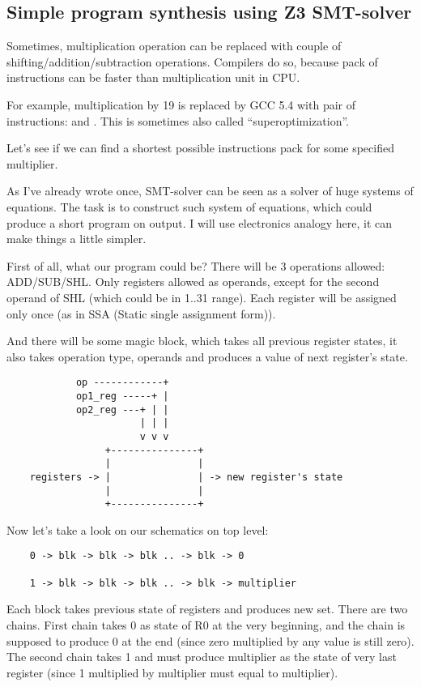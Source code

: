 \subsection{Simple program synthesis using Z3 SMT-solver}

Sometimes, multiplication operation can be replaced with couple of shifting/addition/subtraction operations.
Compilers do so, because pack of instructions can be faster than multiplication unit in CPU.

For example, multiplication by 19 is replaced by GCC 5.4 with pair of instructions:  and
.
This is sometimes also called ``superoptimization''.

Let's see if we can find a shortest possible instructions pack for some specified multiplier.

As I've already wrote once, SMT-solver can be seen as a solver of huge systems of equations.
The task is to construct such system of equations, which could produce a short program on output.
I will use electronics analogy here, it can make things a little simpler.

First of all, what our program could be? There will be 3 operations allowed: ADD/SUB/SHL.
Only registers allowed as operands, except for the second operand of SHL (which could be in 1..31 range).
Each register will be assigned only once (as in SSA (Static single assignment form)).

And there will be some magic block, which takes all previous register states, it also takes operation type,
operands and produces a value of next register's state.

\begin{lstlisting}
	        op ------------+
	        op1_reg -----+ |
	        op2_reg ---+ | |
	                   | | |
	                   v v v
	             +---------------+
	             |               |
	registers -> |               | -> new register's state
	             |               |
	             +---------------+
\end{lstlisting}


Now let's take a look on our schematics on top level:

\begin{lstlisting}
	0 -> blk -> blk -> blk .. -> blk -> 0

	1 -> blk -> blk -> blk .. -> blk -> multiplier
\end{lstlisting}

Each block takes previous state of registers and produces new set.
There are two chains.
First chain takes 0 as state of R0 at the very beginning, and the chain is supposed to produce 0 at the end
(since zero multiplied by any value is still zero).
The second chain takes 1 and must produce multiplier as the state of very last register
(since 1 multiplied by multiplier must equal to multiplier).

